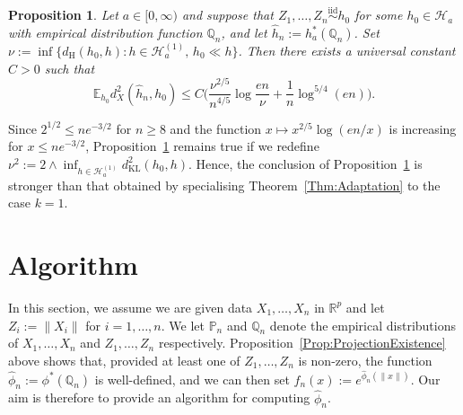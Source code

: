 \documentclass[a4paper,12pt]{article}
\newtheorem{proposition}[theorem]{Proposition}
\newenvironment{remark}[1][Remark:]{\begin{trivlist}
\item[\hskip \labelsep {\bfseries #1}]}{\end{trivlist}}
\begin{document}
\begin{proposition}
  \label{Prop:AdaptiveRateAffine}
  Let $a \in [0, \infty)$ and suppose that $Z_1,\ldots,Z_n \stackrel{\mathrm{iid}}{\sim} h_0$ for some $h_0 \in \mathcal{H}_{a}$ with empirical distribution function $\mathbb{Q}_n$, and let $\hat{h}_n := h_{a}^*(\mathbb{Q}_n)$.  Set $\nu := \inf \{  d_{\mathrm{H}}(h_0, h) : h \in \mathcal{H}_{a}^{(1)},\, h_0 \ll  h\}$.  Then there exists a universal constant $C > 0$ such that 
  \[
    \mathbb{E}_{h_0} d^2_X(\hat{h}_n,h_0) \leq  C\biggl(\frac{\nu^{2/5}}{n^{4/5}}\log\frac{en}{\nu} + \frac{1}{n}\log^{5/4}(en)\biggr).
  \]
\end{proposition}
\begin{remark}
  Since $2^{1/2} \leq n e^{-3/2}$ for $n \geq 8$ and the function $x \mapsto x^{2/5} \log(en /x)$ is increasing for $x \leq n e^{-3/2}$, Proposition~\ref{Prop:AdaptiveRateAffine} remains true if we redefine $\nu^2 := 2 \wedge \inf_{ h \in \mathcal{H}_a^{(1)}} d^2_{\mathrm{KL}}(h_0, h) $. Hence, the conclusion of Proposition~\ref{Prop:AdaptiveRateAffine} is stronger than that obtained by specialising Theorem~\ref{Thm:Adaptation} to the case $k=1$.
\end{remark}

\section{Algorithm}
\label{Sec:Algorithm}

In this section, we assume we are given data $X_1, \ldots, X_n$ in $\mathbb{R}^p$ and let $Z_i := \| X_i \|$ for $i=1,\ldots,n$.  We let $\mathbb{P}_n$ and $\mathbb{Q}_n$ denote the empirical distributions of $X_1,\ldots,X_n$ and $Z_1,\ldots,Z_n$ respectively.  Proposition~\ref{Prop:ProjectionExistence} above shows that, provided at least one of $Z_1,\ldots,Z_n$ is non-zero, the function $\hat{\phi}_n := \phi^*(\mathbb{Q}_n)$ is well-defined, and we can then set $\hat{f}_n(x) := e^{\hat{\phi}_n(\|x\|)}$.  Our aim is therefore to provide an algorithm for computing $\hat{\phi}_n$.
\end{document}
